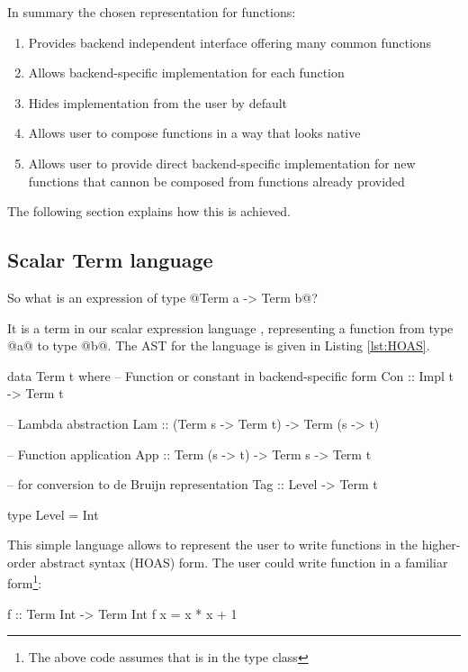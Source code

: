 \documentclass[preamble.tex]{subfiles}
\begin{document}
In summary the chosen representation for functions:
\begin{enumerate}
\item Provides backend independent interface offering many common functions
\item Allows backend-specific implementation for each function
\item Hides implementation from the user by default
\item Allows user to compose functions in a way that looks native
\item Allows user to provide direct backend-specific implementation for new functions that cannon be composed from functions already provided
\end{enumerate}

The following section explains how this is achieved.

\subsection{Scalar Term language}

So what is an expression of type @Term a -> Term b@?

It is a term in our scalar expression language , representing a function from type @a@ to type @b@. The AST for the  language is given in Listing \ref{lst:HOAS}.

\begin{hscode2}[%
    caption={Term language for HOAS representation.},%
    label=lst:HOAS,%
]
data Term t where
  -- Function or constant in backend-specific form
  Con :: Impl t -> Term t

  -- Lambda abstraction
  Lam :: (Term s -> Term t) -> Term (s -> t)

  -- Function application
  App :: Term (s -> t) -> Term s -> Term t

  -- for conversion to de Bruijn representation
  Tag :: Level -> Term t

type Level = Int
\end{hscode2}

This simple language allows to represent the user to write functions in the higher-order abstract syntax (HOAS) form. The user could write function in a familiar form\footnote{The above code assumes that  is in the type class }:

\begin{hscode}
f :: Term Int -> Term Int
f x = x * x + 1
\end{hscode}
\end{document}

